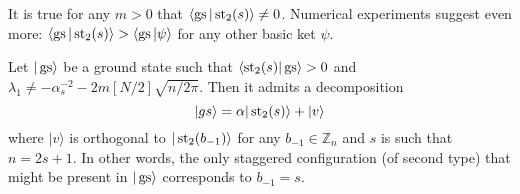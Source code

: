 \begin{conj}
It is true for any $m > 0$ that $\langle \operatorname{gs}|\operatorname{st}_2(s)\rangle \neq 0$. Numerical experiments suggest even more: $\langle \operatorname{gs} | \operatorname{st}_2(s)\rangle > \langle \operatorname{gs} | \psi \rangle$ for any other basic ket $\psi$.
\end{conj}

\begin{lemma}\label{l:gs_dec}
Let $|\operatorname{gs}\rangle$ be a ground state such that $\langle \operatorname{st}_2(s)|\operatorname{gs} \rangle > 0$ and $\lambda_1 \neq - \alpha_s^{-2} -2m[N/2]\sqrt{n/2\pi}$. Then it admits a decomposition
\[
|gs\rangle = \alpha |\operatorname{st}_2(s) \rangle + | v\rangle
\]
where $|v\rangle$ is orthogonal to $|\operatorname{st}_2(b_{-1})\rangle$ for any $b_{-1} \in \mathbb Z_n$ and $s$ is such that $n = 2s + 1$. In other words, the only staggered configuration (of second type) that might be present in $|\operatorname{gs}\rangle$ corresponds to $b_{-1} = s$. 
\end{lemma}
